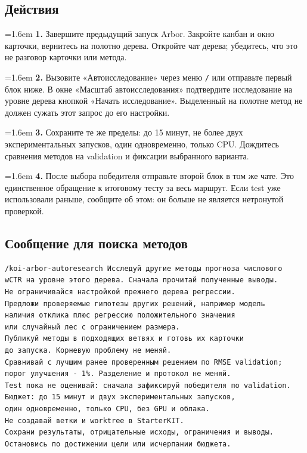 \documentclass[10pt,a4paper]{article}
\begin{document}
\subsection*{Действия}
\par\noindent\hangindent=1.6em \textbf{1.} Завершите предыдущий запуск Arbor. Закройте канбан и окно карточки, вернитесь на полотно дерева. Откройте чат дерева; убедитесь, что это не разговор карточки или метода.\par
\par\noindent\hangindent=1.6em \textbf{2.} Вызовите «Автоисследование» через меню \texttt{/} или отправьте первый блок ниже. В окне «Масштаб автоисследования» подтвердите исследование на уровне дерева кнопкой «Начать исследование». Выделенный на полотне метод не должен сужать этот запрос до его настройки.\par
\par\noindent\hangindent=1.6em \textbf{3.} Сохраните те же пределы: до 15 минут, не более двух экспериментальных запусков, один одновременно, только CPU. Дождитесь сравнения методов на validation и фиксации выбранного варианта.\par
\par\noindent\hangindent=1.6em \textbf{4.} После выбора победителя отправьте второй блок в том же чате. Это единственное обращение к итоговому тесту за весь маршрут. Если test уже использовали раньше, сообщите об этом: он больше не является нетронутой проверкой.\par
\subsection*{Сообщение для поиска методов}
\begin{promptbox}
\begin{Verbatim}
/koi-arbor-autoresearch Исследуй другие методы прогноза числового
wCTR на уровне этого дерева. Сначала прочитай полученные выводы.
Не ограничивайся настройкой прежнего дерева регрессии.
Предложи проверяемые гипотезы других решений, например модель
наличия отклика плюс регрессию положительного значения
или случайный лес с ограничением размера.
Публикуй методы в подходящих ветвях и готовь их карточки
до запуска. Корневую проблему не меняй.
Сравнивай с лучшим ранее проверенным решением по RMSE validation;
порог улучшения - 1%. Разделение и протокол не меняй.
Test пока не оценивай: сначала зафиксируй победителя по validation.
Бюджет: до 15 минут и двух экспериментальных запусков,
один одновременно, только CPU, без GPU и облака.
Не создавай ветки и worktree в StarterKIT.
Сохрани результаты, отрицательные исходы, ограничения и выводы.
Остановись по достижении цели или исчерпании бюджета.
\end{Verbatim}
\end{promptbox}
\newpage
\end{document}
